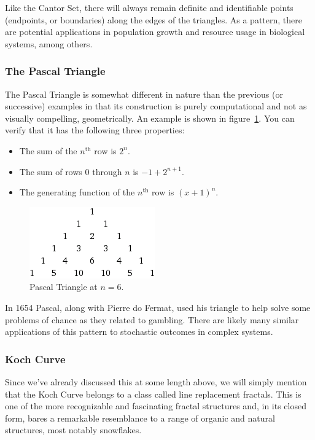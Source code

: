 \documentclass[jou,apacite]{apa6}
\begin{document}
Like the Cantor Set, there will always remain definite and identifiable points (endpoints, or boundaries) along the edges of the triangles.  As a pattern, there are potential applications in population growth and resource usage in biological systems, among others.

\subsubsection{The Pascal Triangle}
The Pascal Triangle is somewhat different in nature than the previous (or successive) examples in that its construction is purely computational and not as visually compelling, geometrically. An example is shown in figure~\ref{fig:pascal}. You can verify that it has the following three properties:
\begin{itemize}
  \item The sum of the $n^{\mbox{th}}$ row is $2^n$.
  \item The sum of rows 0 through $n$ is $-1+2^{n+1}$.
  \item The generating function of the $n^{\mbox{th}}$ row is $(x+1)^n$.
\end{itemize}

\begin{figure}[htpb]
  \centering
  \includegraphics[width=0.75\columnwidth]{images/pascal.png}
  \caption{Pascal Triangle at $n=6$.}
  \label{fig:pascal}
\end{figure}

In 1654 Pascal, along with Pierre do Fermat, used his triangle to help solve some problems of chance as they related to gambling.  There are likely many similar applications of this pattern to stochastic outcomes in complex systems.

\subsubsection{Koch Curve}
Since we've already discussed this at some length above, we will simply mention that the Koch Curve belongs to a class called line replacement fractals.  This is one of the more recognizable and fascinating fractal structures and, in its closed form, bares a remarkable resemblance to a range of organic and natural structures, most notably snowflakes.
\end{document}
